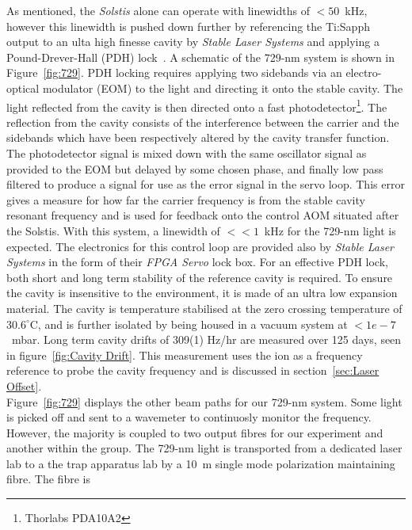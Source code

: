     As mentioned, the \emph{Solstis} alone can operate with linewidths of
    $<50$~kHz, however this linewidth is pushed down further by referencing the Ti:Sapph output
    to an ulta high finesse cavity by \emph{Stable Laser Systems} and applying
    a Pound-Drever-Hall (PDH) lock~\cite{}.  A schematic of the 729-nm system is
    shown in Figure~\ref{fig:729}.  PDH locking requires applying two sidebands
    via an electro-optical modulator (EOM) to the light and directing it onto
    the stable cavity. The light reflected from the cavity is then directed onto
    a fast photodetector\footnote{Thorlabs PDA10A2}. The reflection from the
    cavity consists of the interference between the carrier and the sidebands
    which have been respectively altered by the cavity transfer function. The
    photodetector signal is mixed down with the same oscillator signal as
    provided to the EOM but delayed by some chosen phase, and finally low pass
    filtered to produce a signal for use as the error signal in the servo loop.
    This error gives a measure for how far the carrier frequency is from the
    stable cavity resonant frequency and is used for feedback onto the control
    AOM situated after the Solstis.
    With this system, a linewidth of $<<1$~kHz for the 729-nm light is expected. 
    The electronics for this control loop are
    provided also by \emph{Stable Laser Systems} in the form of their \emph{FPGA Servo}
    lock box. For an effective PDH lock, both short and long term
    stability of the reference cavity is required. To ensure the cavity is insensitive to
    the environment, it is made of an ultra low expansion material. 
    The cavity is temperature stabilised at the zero crossing temperature of
    $30.6^\circ$C, and is further isolated by being housed in a vacuum system
    at $<1e-7$~mbar. Long term cavity drifts of 309(1) Hz/hr are measured over
    125 days, seen in figure~\ref{fig:Cavity Drift}. This measurement uses the ion as a
    frequency reference to probe the cavity frequency and is discussed in
    section~\ref{sec:Laser Offset}.\\
    Figure~\ref{fig:729} displays the other beam paths for our 729-nm system.
    Some light is picked off and sent to a wavemeter to continuosly monitor the
    frequency. However, the majority is coupled to two output fibres for our
    experiment and another within the group. The 729-nm light is transported from
    a dedicated laser lab to a the trap apparatus lab by a 10~m
    single mode polarization maintaining fibre.  The fibre is

